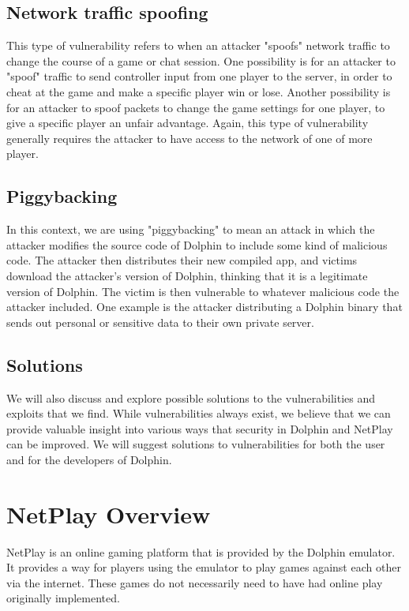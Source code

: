 \documentclass[conference]{IEEEtran}
\begin{document}
\subsection{Network traffic spoofing}
This type of vulnerability refers to when an attacker "spoofs" network traffic to change the course of a game or chat session.
One possibility is for an attacker to "spoof" traffic to send controller input from one player to the server, in order to cheat at the game and make a specific player win or lose.
Another possibility is for an attacker to spoof packets to change the game settings for one player, to give a specific player an unfair advantage.
Again, this type of vulnerability generally requires the attacker to have access to the network of one of more player.

\subsection{Piggybacking}
In this context, we are using "piggybacking" to mean an attack in which the attacker modifies the source code of Dolphin to include some kind of malicious code.
The attacker then distributes their new compiled app, and victims download the attacker's version of Dolphin, thinking that it is a legitimate version of Dolphin.
The victim is then vulnerable to whatever malicious code the attacker included.
One example is the attacker distributing a Dolphin binary that sends out personal or sensitive data to their own private server.

\subsection{Solutions}
We will also discuss and explore possible solutions to the vulnerabilities and exploits that we find.
While vulnerabilities always exist, we believe that we can provide valuable insight into various ways that security in Dolphin and NetPlay can be improved. 
We will suggest solutions to vulnerabilities for both the user and for the developers of Dolphin.

\section{NetPlay Overview}
NetPlay is an online gaming platform that is provided by the Dolphin emulator. It provides a way for players using the emulator to play games against each other via the internet. These games do not necessarily need to have had online play originally implemented. 
\end{document}
